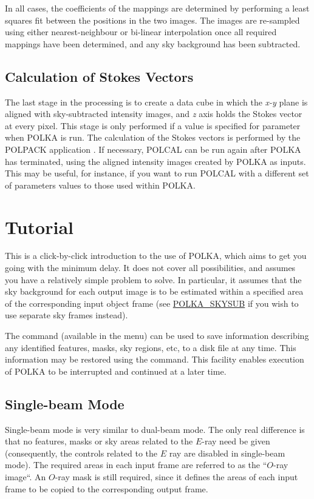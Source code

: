 In all cases, the coefficients of the mappings are determined by
performing a least squares fit between the positions in the two images.
The images are re-sampled using either nearest-neighbour or bi-linear
interpolation once all required mappings have been determined, and any
sky background has been subtracted.

\subsection{Calculation of Stokes Vectors}
The last stage in the processing is to create a data cube in which the
{\em x-y} plane is aligned with sky-subtracted intensity images, and {\em
z} axis holds the Stokes vector at every pixel. This stage is only
performed if a value is specified for parameter 
when POLKA is run. The calculation of the Stokes vectors is performed by
the POLPACK application . If necessary, 
POLCAL can be run again after POLKA has terminated, using the aligned
intensity images created by POLKA as inputs. This may be useful, for
instance, if you want to run POLCAL with a different set of parameters 
values to those used within POLKA.

\section {Tutorial}
This is a click-by-click introduction to the use of POLKA, which aims to
get you going with the minimum delay. It does not cover all possibilities,
and assumes you have a relatively simple problem to solve. In particular, 
it assumes that the sky background for each output image is to be
estimated within a specified area of the corresponding input object frame
(see \hyperref{here}{section }{}{POLKA_SKYSUB} if you wish to use
separate sky frames instead).

The  command (available in the
 menu) can be used to save
information describing any identified features, masks, sky regions, etc,
to a disk file at any time. This information may be restored using the
 command. This facility enables
execution of POLKA to be interrupted and continued at a later time.

\subsection {Single-beam Mode}
Single-beam mode is very similar to dual-beam mode. The only real
difference is that no features, masks or sky areas related to the $E$-ray
need be given (consequently, the controls related to the $E$ ray are
disabled in single-beam mode). The required areas in each input frame are
referred to as the ``$O$-ray image``. An $O$-ray mask is still required,
since it defines the areas of each input frame to be copied to the
corresponding output frame.

